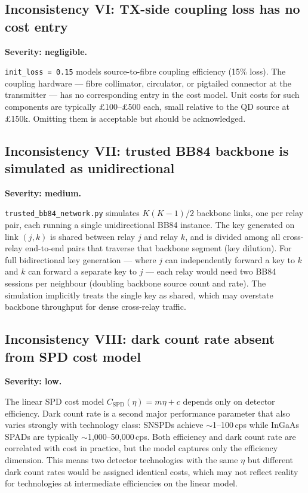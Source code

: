 \documentclass[12pt,a4paper]{article}
\begin{document}
\subsection{Inconsistency VI: TX-side coupling loss has no cost entry}

\textbf{Severity: negligible.}

\texttt{init\_loss = 0.15} models source-to-fibre coupling efficiency
(15\% loss). The coupling hardware --- fibre collimator, circulator, or
pigtailed connector at the transmitter --- has no corresponding entry in
the cost model. Unit costs for such components are typically
\pounds100--\pounds500 each, small relative to the QD source at \pounds150k.
Omitting them is acceptable but should be acknowledged.

\subsection{Inconsistency VII: trusted BB84 backbone is simulated as unidirectional}

\textbf{Severity: medium.}

\texttt{trusted\_bb84\_network.py} simulates $K(K{-}1)/2$ backbone links,
one per relay pair, each running a single unidirectional BB84 instance.
The key generated on link $(j, k)$ is shared between relay $j$ and relay $k$,
and is divided among all cross-relay end-to-end pairs that traverse that
backbone segment (key dilution). For full bidirectional key generation ---
where $j$ can independently forward a key to $k$ and $k$ can forward a
separate key to $j$ --- each relay would need two BB84 sessions per neighbour
(doubling backbone source count and rate). The simulation implicitly treats
the single key as shared, which may overstate backbone throughput for dense
cross-relay traffic.

\subsection{Inconsistency VIII: dark count rate absent from SPD cost model}

\textbf{Severity: low.}

The linear SPD cost model $C_{\mathrm{SPD}}(\eta) = m\eta + c$ depends only
on detector efficiency. Dark count rate is a second major performance
parameter that also varies strongly with technology class: SNSPDs achieve
$\sim$1--100\,cps while InGaAs SPADs are typically $\sim$1{,}000--50{,}000\,cps.
Both efficiency and dark count rate are correlated with cost in practice, but
the model captures only the efficiency dimension. This means two detector
technologies with the same $\eta$ but different dark count rates would be
assigned identical costs, which may not reflect reality for technologies
at intermediate efficiencies on the linear model.
\end{document}
